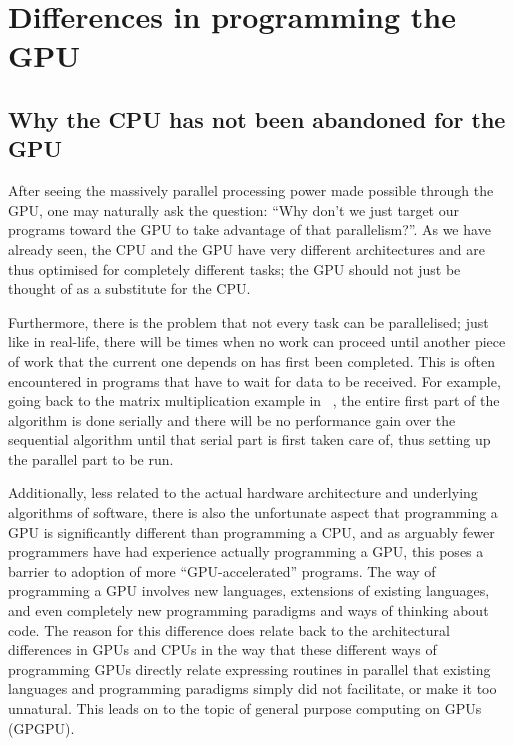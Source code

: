 \documentclass[a4paper,11pt]{article}
\begin{document}



\newpage

\section{Differences in programming the GPU} %
\label{sec:differences_in_programming_the_gpu}

\subsection{Why the CPU has not been abandoned for the GPU} %
\label{sub:why_programs_aren_t_written_just_for_gpus_rather_than_cpus}
After seeing the massively parallel processing power made possible through the GPU, one may naturally ask the question:
``Why don't we just target our programs toward the GPU to take advantage of that parallelism?''. As we have already seen,
the CPU and the GPU have very different architectures and are thus optimised for completely different tasks; the GPU
should not just be thought of as a substitute for the CPU.

Furthermore, there is the problem that not every task can be parallelised; just like in real-life, there will be times when
no work can proceed until another piece of work that the current one depends on has first been completed. This is often encountered
in programs that have to wait for data to be received. For example, going back to the matrix multiplication example in
~, the entire first part of the algorithm is done serially and there will be no performance gain
over the sequential algorithm until that serial part is first taken care of, thus setting up the parallel part to be run.

Additionally, less related to the actual hardware architecture and underlying algorithms of software, there is also the
unfortunate aspect that programming a GPU is significantly different than programming a CPU, and as arguably fewer programmers
have had experience actually programming a GPU, this poses a barrier to adoption of more ``GPU-accelerated'' programs.
The way of programming a GPU involves new languages, extensions of existing languages, and even completely new programming
paradigms and ways of thinking about code. The reason for this difference does relate back to the architectural differences
in GPUs and CPUs in the way that these different ways of programming GPUs directly relate expressing routines in parallel
that existing languages and programming paradigms simply did not facilitate, or make it too unnatural. This leads on to
the topic of general purpose computing on GPUs (GPGPU).
\end{document}
